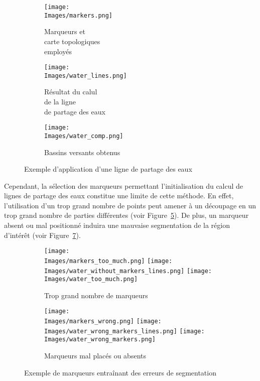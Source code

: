 \documentclass[\main/main.tex]{subfiles}
\begin{document}
\begin{figure}[h]
    \begin{subfigure}[b]{0.30\textwidth}
       \caption{
           \label{fig:lpe:marqueurs}
            Marqueurs et\\ carte topologiques\\employés
            }
       \centering \texttt{[image: \\Images/markers.png]}
    \end{subfigure}
    \begin{subfigure}[b]{0.30\textwidth}
       \caption{
           \label{fig:lpe:lines}
            Résultat du calul\\ de la ligne\\ de partage des eaux
            }
       \centering \texttt{[image: \\Images/water\_lines.png]}
    \end{subfigure}
    \begin{subfigure}[b]{0.30\textwidth}
       \caption{
           \label{fig:lpe:zones}
            Bassins versants obtenus
            }
       \centering \texttt{[image: \\Images/water\_comp.png]}
    \end{subfigure}
    \caption{
        Exemple d'application d'une ligne de partage des eaux
    }
    
\end{figure}

%
%
Cependant, la sélection des marqueurs permettant l'initialisation du calcul de lignes de partage des eaux constitue une limite de cette méthode.
%
En effet, l'utilisation d'un trop grand nombre de points peut amener à un découpage en un trop grand nombre de parties différentes (voir Figure~\ref{fig:watershed:errors:quantite}).
%
De plus, un marqueur absent ou mal positionné induira une mauvaise segmentation de la région d'intérêt (voir Figure~\ref{fig:watershed:errors:position}).

\begin{figure}[h]
    \begin{subfigure}[b]{\textwidth}
       \caption{
           \label{fig:watershed:errors:quantite}
            Trop grand nombre de marqueurs
            }
       \centering \texttt{[image: \\Images/markers\_too\_much.png]} \texttt{[image: \\Images/water\_without\_markers\_lines.png]}
       \centering \texttt{[image: \\Images/water\_too\_much.png]}
    \end{subfigure}
    \begin{subfigure}[b]{\textwidth}
       \caption{
           \label{fig:watershed:errors:position}
            Marqueurs mal placés ou absents
            }
       \centering \texttt{[image: \\Images/markers\_wrong.png]} \texttt{[image: \\Images/water\_wrong\_markers\_lines.png]}
       \centering \texttt{[image: \\Images/water\_wrong\_markers.png]}
       \centering
    \end{subfigure}
    \caption{
        Exemple de marqueurs entraînant des erreurs de segmentation
    }
    
\end{figure}
\end{document}
